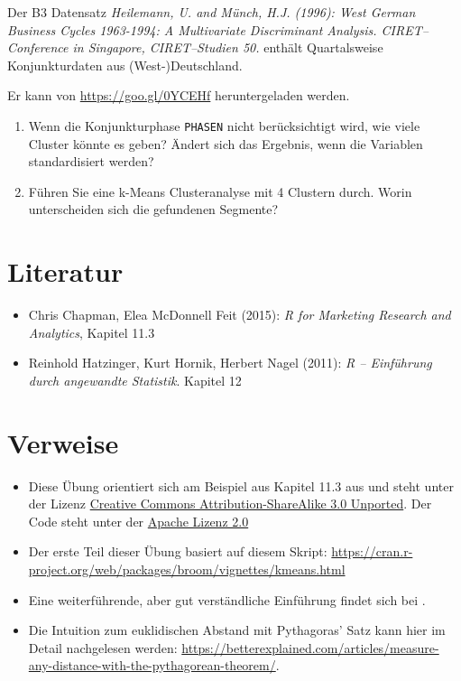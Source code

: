 \documentclass[12pt,ngerman,]{book}
\providecommand{\tightlist}{%
  \setlength{\itemsep}{0pt}\setlength{\parskip}{0pt}}
\begin{document}
Der B3 Datensatz \emph{Heilemann, U. and Münch, H.J. (1996): West German
Business Cycles 1963-1994: A Multivariate Discriminant Analysis.
CIRET--Conference in Singapore, CIRET--Studien 50.} enthält
Quartalsweise Konjunkturdaten aus (West-)Deutschland.

Er kann von \url{https://goo.gl/0YCEHf} heruntergeladen werden.

\begin{enumerate}
\def\labelenumi{\arabic{enumi}.}
\tightlist
\item
  Wenn die Konjunkturphase \texttt{PHASEN} nicht berücksichtigt wird,
  wie viele Cluster könnte es geben? Ändert sich das Ergebnis, wenn die
  Variablen standardisiert werden?
\item
  Führen Sie eine k-Means Clusteranalyse mit 4 Clustern durch. Worin
  unterscheiden sich die gefundenen Segmente?
\end{enumerate}

\section{Literatur}\label{literatur-3}

\begin{itemize}
\tightlist
\item
  Chris Chapman, Elea McDonnell Feit (2015): \emph{R for Marketing
  Research and Analytics}, Kapitel 11.3
\item
  Reinhold Hatzinger, Kurt Hornik, Herbert Nagel (2011): \emph{R --
  Einführung durch angewandte Statistik}. Kapitel 12
\end{itemize}

\section{Verweise}\label{verweise-6}

\begin{itemize}
\item
  Diese Übung orientiert sich am Beispiel aus Kapitel 11.3 aus
  \citet{Chapman2015} und steht unter der Lizenz
  \href{http://creativecommons.org/licenses/by-sa/3.0}{Creative Commons
  Attribution-ShareAlike 3.0 Unported}. Der Code steht unter der
  \href{http://www.apache.org/licenses/LICENSE-2.0}{Apache Lizenz 2.0}
\item
  Der erste Teil dieser Übung basiert auf diesem Skript:
  \url{https://cran.r-project.org/web/packages/broom/vignettes/kmeans.html}
\item
  Eine weiterführende, aber gut verständliche Einführung findet sich bei
  \citet{james2013introduction}.
\item
  Die Intuition zum euklidischen Abstand mit Pythagoras' Satz kann hier
  im Detail nachgelesen werden:
  \url{https://betterexplained.com/articles/measure-any-distance-with-the-pythagorean-theorem/}.
\end{itemize}
\end{document}
